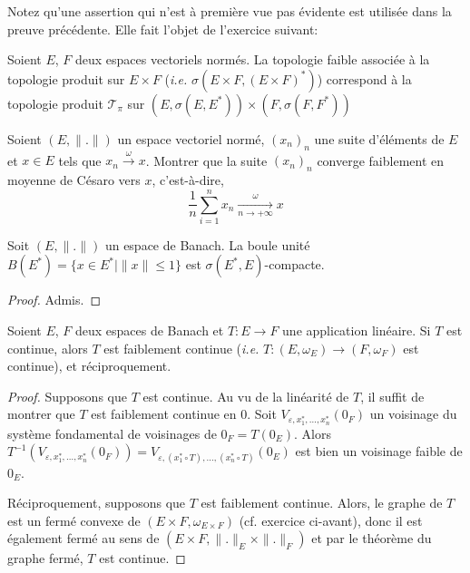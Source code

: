 Notez qu'une assertion qui n'est à première vue pas évidente est utilisée
dans la preuve précédente. Elle fait l'objet de l'exercice suivant:
\begin{exo}\label{faib:ex:prod}
  Soient $E$, $F$ deux espaces vectoriels normés. La topologie faible
  associée à la topologie produit sur $E\times F$ (\emph{i.e.}
  $\sigma\left(E\times F, (E\times F)^*\right)$) correspond à la
  topologie produit $\mathcal{T}_\pi$ sur
  $(E, \sigma(E, E^*))\times (F, \sigma(F, F^*))$
\end{exo}

\begin{exo}
  Soient $(E, \|.\|)$ un espace vectoriel normé, $(x_n)_n$ une suite
  d'éléments de $E$ et $x\in E$ tels que $x_n\xrightarrow{\omega}x$.
  Montrer que la suite $(x_n)_n$ converge faiblement en moyenne
  de Césaro vers $x$, c'est-à-dire,
  \begin{equation*}
    \frac{1}{n}\sum_{i=1}^nx_n\xrightarrow[n\to +\infty]{\omega} x
  \end{equation*}
\end{exo}

\begin{thm}
  Soit $(E, \|.\|)$ un espace de Banach. La boule unité
  $B(E^*)=\{x\in E^*\mid \|x\|\leq 1\}$ est $\sigma(E^*, E)$-compacte.
\end{thm}
\begin{proof}
  Admis.
\end{proof}

\begin{thm}
  Soient $E$, $F$ deux espaces de Banach et $T:E\to F$ une application
  linéaire. Si $T$ est continue, alors $T$ est faiblement continue
  (\emph{i.e.} $T: (E, \omega_E)\to(F, \omega_F)$ est continue),
  et réciproquement.
\end{thm}

\begin{proof}
  Supposons que $T$ est continue. Au vu de la linéarité de $T$, il suffit
  de montrer que $T$ est faiblement continue en $0$. Soit
  $V_{\varepsilon, x^*_1, \ldots, x^*_n}(0_F)$ un voisinage du système fondamental
  de voisinages de $0_F=T(0_E)$.
  Alors $T^{-1}\left(V_{\varepsilon, x^*_1, \ldots, x^*_n}(0_F)\right) =
  V_{\varepsilon, (x^*_1\circ T), \ldots, (x^*_n\circ T)}(0_E)$ est bien un
  voisinage faible de $0_E$.

  Réciproquement, supposons que $T$ est faiblement continue. Alors, le
  graphe de $T$ est un fermé convexe de $(E\times F, \omega_{E\times F})$
  (cf. exercice ci-avant),
  donc il est également fermé au sens de $(E\times F, \|.\|_E\times \|.\|_F)$
  et par le théorème du graphe fermé, $T$ est continue.
\end{proof}

